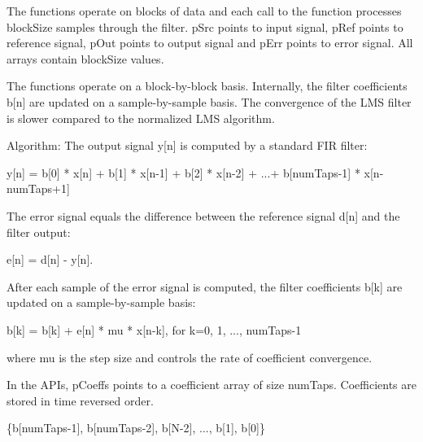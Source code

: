 The functions operate on blocks of data and each call to the function processes {\ttfamily block\-Size} samples through the filter. {\ttfamily p\-Src} points to input signal, {\ttfamily p\-Ref} points to reference signal, {\ttfamily p\-Out} points to output signal and {\ttfamily p\-Err} points to error signal. All arrays contain {\ttfamily block\-Size} values.

The functions operate on a block-\/by-\/block basis. Internally, the filter coefficients {\ttfamily b\mbox{[}n\mbox{]}} are updated on a sample-\/by-\/sample basis. The convergence of the L\-M\-S filter is slower compared to the normalized L\-M\-S algorithm.

\begin{DoxyParagraph}{Algorithm\-: }
The output signal {\ttfamily y\mbox{[}n\mbox{]}} is computed by a standard F\-I\-R filter\-: 
\begin{DoxyPre}    
     y[n] = b[0] * x[n] + b[1] * x[n-1] + b[2] * x[n-2] + ...+ b[numTaps-1] * x[n-numTaps+1]    
 \end{DoxyPre}

\end{DoxyParagraph}
\begin{DoxyParagraph}{}
The error signal equals the difference between the reference signal {\ttfamily d\mbox{[}n\mbox{]}} and the filter output\-: 
\begin{DoxyPre}    
     e[n] = d[n] - y[n].    
 \end{DoxyPre}

\end{DoxyParagraph}
\begin{DoxyParagraph}{}
After each sample of the error signal is computed, the filter coefficients {\ttfamily b\mbox{[}k\mbox{]}} are updated on a sample-\/by-\/sample basis\-: 
\begin{DoxyPre}    
     b[k] = b[k] + e[n] * mu * x[n-k],  for k=0, 1, ..., numTaps-1    
 \end{DoxyPre}
 where {\ttfamily mu} is the step size and controls the rate of coefficient convergence. 
\end{DoxyParagraph}
\begin{DoxyParagraph}{}
In the A\-P\-Is, {\ttfamily p\-Coeffs} points to a coefficient array of size {\ttfamily num\-Taps}. Coefficients are stored in time reversed order. 
\end{DoxyParagraph}
\begin{DoxyParagraph}{}

\begin{DoxyPre}    
    \{b[numTaps-1], b[numTaps-2], b[N-2], ..., b[1], b[0]\}    
 \end{DoxyPre}
 
\end{DoxyParagraph}
